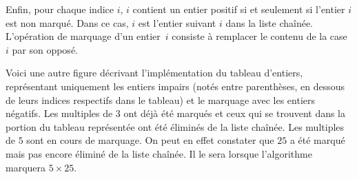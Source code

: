 \documentclass[a4paper]{easychair}
\newcommand\arr[1]{\ocamlf{arr[}#1\ocamlf{]}}
\begin{document}
Enfin, pour chaque indice $i$, \arr{$i$} contient un entier positif
si et seulement si l'entier $i$ est non marqué.
Dans ce cas, \arr{$i$} est l'entier suivant $i$ dans la liste chaînée.
L'opération de marquage d'un entier~$i$ consiste à remplacer le
contenu de la case~$i$ par son opposé.



Voici une autre figure décrivant l'implémentation du tableau d'entiers,
représentant uniquement les entiers impairs (notés entre parenthèses, en
dessous de leurs indices respectifs dans le tableau) et le marquage avec
les entiers négatifs. Les multiples de $3$ ont
déjà été marqués et ceux qui se trouvent dans la portion du tableau
représentée
ont été éliminés de la liste chaînée.
Les multiples de $5$ sont en cours de marquage.
On peut en effet constater que $25$ a été marqué mais pas encore éliminé de
la liste chaînée. Il le sera lorsque l'algorithme marquera $5 \times 25$.
\end{document}
